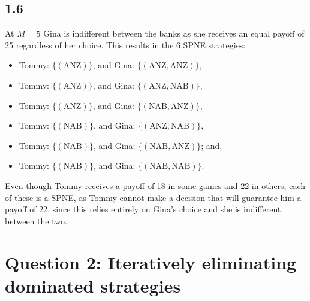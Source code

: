 \documentclass{article}
\begin{document}
\subsection*{1.6}
At $M=5$ Gina is indifferent between the banks as she receives an equal payoff of 25 regardless of her choice. This results in the 6 SPNE strategies:
\begin{itemize}
    \item Tommy: $\{(\mbox{ANZ})\}$, and Gina: $\{(\mbox{ANZ}, \mbox{ANZ})\}$,
    \item Tommy: $\{(\mbox{ANZ})\}$, and Gina: $\{(\mbox{ANZ}, \mbox{NAB})\}$,
    \item Tommy: $\{(\mbox{ANZ})\}$, and Gina: $\{(\mbox{NAB}, \mbox{ANZ})\}$,
    \item Tommy: $\{(\mbox{NAB})\}$, and Gina: $\{(\mbox{ANZ}, \mbox{NAB})\}$,
    \item Tommy: $\{(\mbox{NAB})\}$, and Gina: $\{(\mbox{NAB}, \mbox{ANZ})\}$; and,
    \item Tommy: $\{(\mbox{NAB})\}$, and Gina: $\{(\mbox{NAB}, \mbox{NAB})\}$.
\end{itemize}
Even though Tommy receives a payoff of 18 in some games and 22 in others, each of these is a SPNE, as Tommy cannot make a decision that will guarantee him a payoff of 22, since this relies entirely on Gina's choice and she is indifferent between the two.

\section*{Question 2: Iteratively eliminating dominated strategies}
\end{document}
